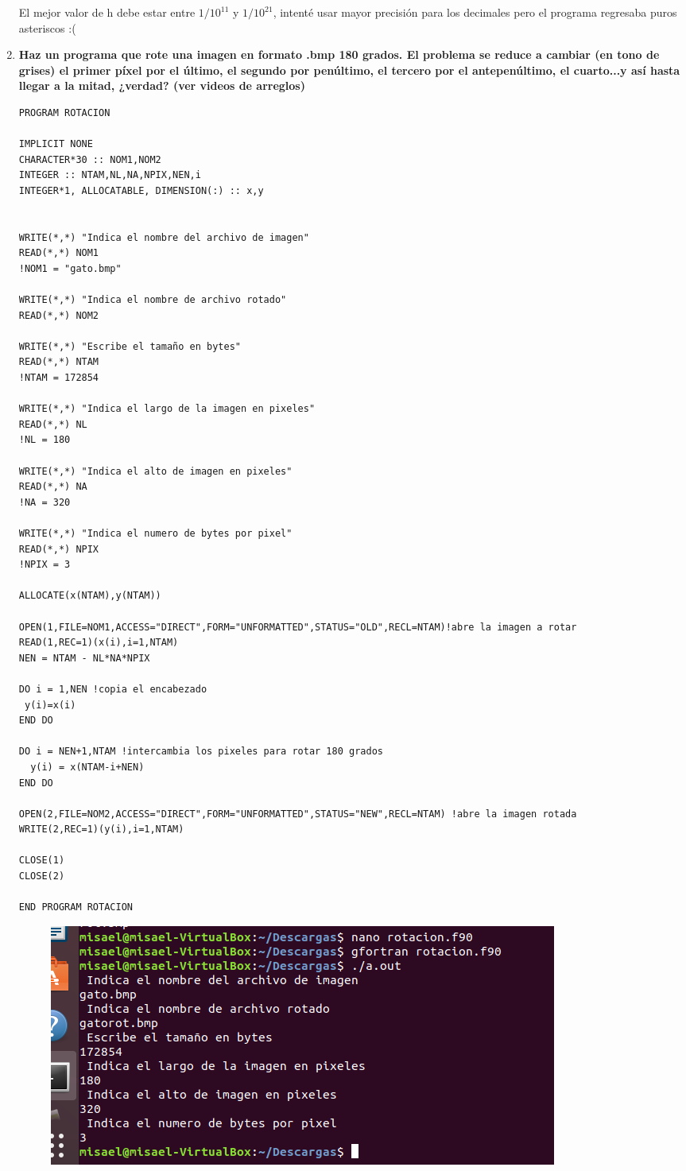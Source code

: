 \documentclass[12pt,a4paper]{article}
\begin{document}
\begin{enumerate}
    El mejor valor de h debe estar entre $1/10^{11}$ y $1/10^{21}$, intenté usar mayor precisión para los decimales pero el programa regresaba puros asteriscos :(
    

    \item \textbf{Haz un programa que rote una imagen en formato .bmp 180 grados. El problema se reduce
    a cambiar (en tono de grises) el primer píxel por el último, el segundo por penúltimo, el tercero
    por el antepenúltimo, el cuarto...y así hasta llegar a la mitad, ¿verdad? (ver videos de arreglos)}
    
    \begin{verbatim}
PROGRAM ROTACION

IMPLICIT NONE
CHARACTER*30 :: NOM1,NOM2
INTEGER :: NTAM,NL,NA,NPIX,NEN,i
INTEGER*1, ALLOCATABLE, DIMENSION(:) :: x,y


WRITE(*,*) "Indica el nombre del archivo de imagen"
READ(*,*) NOM1
!NOM1 = "gato.bmp"

WRITE(*,*) "Indica el nombre de archivo rotado"
READ(*,*) NOM2

WRITE(*,*) "Escribe el tamaño en bytes"
READ(*,*) NTAM
!NTAM = 172854

WRITE(*,*) "Indica el largo de la imagen en pixeles"
READ(*,*) NL
!NL = 180

WRITE(*,*) "Indica el alto de imagen en pixeles"
READ(*,*) NA
!NA = 320

WRITE(*,*) "Indica el numero de bytes por pixel"
READ(*,*) NPIX
!NPIX = 3

ALLOCATE(x(NTAM),y(NTAM))

OPEN(1,FILE=NOM1,ACCESS="DIRECT",FORM="UNFORMATTED",STATUS="OLD",RECL=NTAM)!abre la imagen a rotar
READ(1,REC=1)(x(i),i=1,NTAM)
NEN = NTAM - NL*NA*NPIX

DO i = 1,NEN !copia el encabezado
 y(i)=x(i)
END DO

DO i = NEN+1,NTAM !intercambia los pixeles para rotar 180 grados
  y(i) = x(NTAM-i+NEN)
END DO

OPEN(2,FILE=NOM2,ACCESS="DIRECT",FORM="UNFORMATTED",STATUS="NEW",RECL=NTAM) !abre la imagen rotada
WRITE(2,REC=1)(y(i),i=1,NTAM)

CLOSE(1)
CLOSE(2)

END PROGRAM ROTACION
    \end{verbatim}
    
    \begin{figure}[h]
        \centering
        \includegraphics[scale=0.8]{3.1.PNG}
    \end{figure}
    

\end{enumerate}
\end{document}

